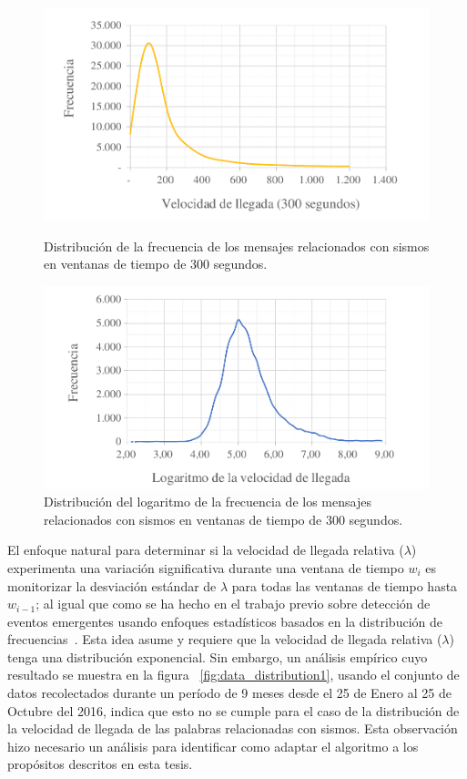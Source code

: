 \begin{figure}[h]
 \includegraphics[trim={20 6 0 6}, clip, width=\linewidth]{imagenes/distribucion_02.pdf}
 \caption{Distribución de la frecuencia de los mensajes relacionados con sismos en ventanas de tiempo de 300 segundos.}
 \label{fig:data_distribution1}
\endminipage\hfill
{}
  \includegraphics[trim={20 0 0 0}, clip, width=\linewidth]{imagenes/distribucion_03.pdf}
  \caption{Distribución del logaritmo de la frecuencia de los mensajes relacionados con sismos en ventanas de tiempo de 300 segundos.}
  \label{fig:data_distribution2}
\endminipage\hfill
\end{figure}


El enfoque natural para determinar si la velocidad de llegada relativa ($\lambda$) experimenta una variación significativa durante una ventana de tiempo $w_i$ es monitorizar la desviación estándar de $\lambda$ para todas las ventanas de tiempo hasta $w_{i-1}$; al igual que como se ha hecho en el trabajo previo sobre detección de eventos emergentes usando enfoques estadísticos basados en la distribución de frecuencias~\cite{kleinberg2003bursty, mathioudakis2010twittermonitor,
nguyen2013event}.
%
Esta idea asume y requiere que la velocidad de llegada relativa ($\lambda$) tenga una distribución exponencial. 
%
Sin embargo, un análisis empírico cuyo resultado se muestra en la figura ~\ref{fig:data_distribution1}, usando el conjunto de datos recolectados durante un período de 9 meses desde el 25 de Enero al 25 de Octubre del 2016, indica que esto no se cumple para el caso de la distribución de la velocidad de llegada de las palabras relacionadas con sismos.
%
Esta observación hizo necesario un análisis para identificar como adaptar el algoritmo a los propósitos descritos en esta tesis.


